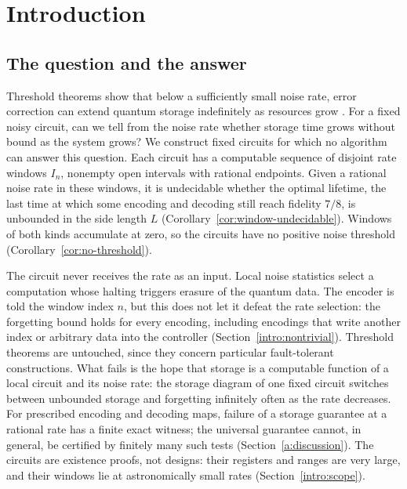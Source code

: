 \makeatletter
\renewcommand\@cite[2]{[{#1\if@tempswa ,\nobreakspace #2\fi}]}
\makeatother
{}
\section{Introduction}\label{s:intro}
\subsection{The question and the answer}\label{intro:question}\label{intro:results}
Threshold theorems show that below a sufficiently small noise rate, error correction can extend quantum storage indefinitely as resources grow \cite{ABO2008,AGP2006,DKLP2002,Kitaev1997,KLZ1998}. For a fixed noisy circuit, can we tell from the noise rate whether storage time grows without bound as the system grows? We construct fixed circuits for which no algorithm can answer this question. Each circuit has a computable sequence of disjoint rate windows \(I_n\), nonempty open intervals with rational endpoints. Given a rational noise rate in these windows, it is undecidable whether the optimal lifetime, the last time at which some encoding and decoding still reach fidelity \(7/8\), is unbounded in the side length \(L\) (Corollary~\ref{cor:window-undecidable}). Windows of both kinds accumulate at zero, so the circuits have no positive noise threshold (Corollary~\ref{cor:no-threshold}).

The circuit never receives the rate as an input. Local noise statistics select a computation whose halting triggers erasure of the quantum data. The encoder is told the window index \(n\), but this does not let it defeat the rate selection: the forgetting bound holds for every encoding, including encodings that write another index or arbitrary data into the controller (Section~\ref{intro:nontrivial}). Threshold theorems are untouched, since they concern particular fault-tolerant constructions. What fails is the hope that storage is a computable function of a local circuit and its noise rate: the storage diagram of one fixed circuit switches between unbounded storage and forgetting infinitely often as the rate decreases. For prescribed encoding and decoding maps, failure of a storage guarantee at a rational rate has a finite exact witness; the universal guarantee cannot, in general, be certified by finitely many such tests (Section~\ref{a:discussion}). The circuits are existence proofs, not designs: their registers and ranges are very large, and their windows lie at astronomically small rates (Section~\ref{intro:scope}).

